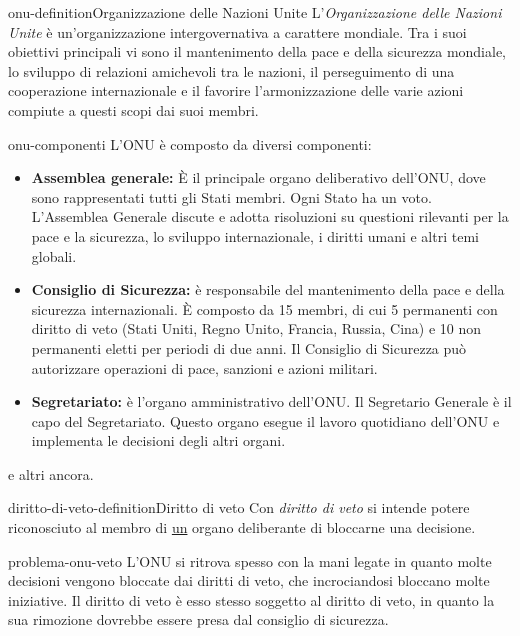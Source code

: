 \documentclass[preview]{standalone}
\begin{document}
\begin{snippetdefinition}{onu-definition}{Organizzazione delle Nazioni Unite}
    L'\textit{Organizzazione delle Nazioni Unite}
    è un'organizzazione intergovernativa a carattere mondiale.
    Tra i suoi obiettivi principali vi sono il mantenimento della pace e
    della sicurezza mondiale, lo sviluppo di relazioni amichevoli tra le nazioni,
    il perseguimento di una cooperazione internazionale e il favorire
    l'armonizzazione delle varie azioni compiute a questi scopi dai suoi membri.
\end{snippetdefinition}


\begin{snippet}{onu-componenti}
    L'ONU è composto da diversi componenti:
    \begin{itemize}
        \item \textbf{Assemblea generale:}
            È il principale organo deliberativo dell'ONU, dove sono rappresentati
            tutti gli Stati membri. Ogni Stato ha un voto.
            L'Assemblea Generale discute e adotta risoluzioni su questioni rilevanti per
            la pace e la sicurezza, lo sviluppo internazionale, i diritti umani e
            altri temi globali.
        \item \textbf{Consiglio di Sicurezza:}
            è responsabile del mantenimento della pace e della
            sicurezza internazionali.
            È composto da 15 membri, di cui 5 permanenti con diritto di veto
            (Stati Uniti, Regno Unito, Francia, Russia, Cina) e 10 non permanenti eletti
            per periodi di due anni. Il Consiglio di Sicurezza può autorizzare
            operazioni di pace, sanzioni e azioni militari.
        \item \textbf{Segretariato:}
            è l'organo amministrativo dell'ONU. Il Segretario Generale
            è il capo del Segretariato. Questo organo esegue il lavoro quotidiano dell'ONU e implementa le decisioni degli altri organi.
    \end{itemize}
    e altri ancora.
\end{snippet}


\begin{snippetdefinition}{diritto-di-veto-definition}{Diritto di veto}
    Con \textit{diritto di veto} si intende
    potere riconosciuto al membro di \underline{un} organo deliberante di bloccarne una decisione. 
\end{snippetdefinition}

\begin{snippet}{problema-onu-veto}
    L'ONU si ritrova spesso con la mani legate in quanto
    molte decisioni vengono bloccate dai diritti di veto, che incrociandosi
    bloccano molte iniziative.
    Il diritto di veto è esso stesso soggetto al diritto di veto, in quanto
    la sua rimozione dovrebbe essere presa dal consiglio di sicurezza.
\end{snippet}
\end{document}
